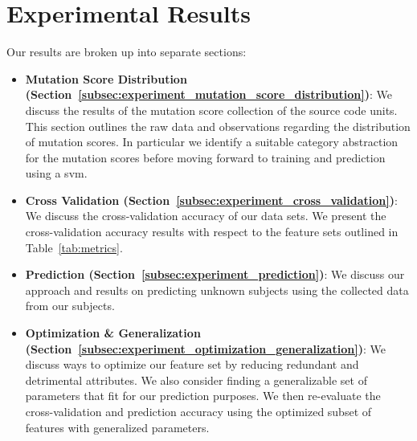 \section{Experimental Results}
\label{sec:experiment_results}
Our results are broken up into separate sections:

\begin{itemize}
  \item \textbf{Mutation Score Distribution (Section~\ref{subsec:experiment_mutation_score_distribution})}: We discuss the results of the mutation score collection of the source code units. This section outlines the raw data and observations regarding the distribution of mutation scores. In particular we identify a suitable category abstraction for the mutation scores before moving forward to training and prediction using a \gls{svm}.
  \item \textbf{Cross Validation (Section~\ref{subsec:experiment_cross_validation})}: We discuss the cross-validation accuracy of our data sets. We present the cross-validation accuracy results with respect to the feature sets outlined in Table~\ref{tab:metrics}.
  \item \textbf{Prediction (Section~\ref{subsec:experiment_prediction})}: We discuss our approach and results on predicting unknown subjects using the collected data from our subjects.
  \item \textbf{Optimization \& Generalization (Section~\ref{subsec:experiment_optimization_generalization})}: We discuss ways to optimize our feature set by reducing redundant and detrimental attributes. We also consider finding a generalizable set of parameters that fit for our prediction purposes. We then re-evaluate the cross-validation and prediction accuracy using the optimized subset of features with generalized parameters.
\end{itemize}


